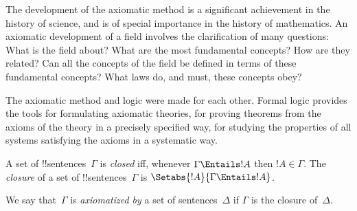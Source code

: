 



\begin{explain}
The development of the axiomatic method is a significant achievement
in the history of science, and is of special importance in the history
of mathematics.  An axiomatic development of a field involves the
clarification of many questions: What is the field about?  What are the
most fundamental concepts?  How are they related?  Can all the
concepts of the field be defined in terms of these fundamental
concepts?  What laws do, and must, these concepts obey?

The axiomatic method and logic were made for each other.  Formal logic
provides the tools for formulating axiomatic theories, for proving
theorems from the axioms of the theory in a precisely specified way,
for studying the properties of all systems satisfying the axioms in a
systematic way.
\end{explain}

\begin{defn}
A set of !!{sentence}s~$\Gamma$ is \emph{closed} iff, whenever
$\Gamma \Entails !A$ then $!A \in \Gamma$.  The \emph{closure} of a set
of !!{sentence}s~$\Gamma$ is $\Setabs{!A}{\Gamma \Entails !A}$.

We say that~$\Gamma$ is \emph{axiomatized by} a set of
sentences~$\Delta$ if $\Gamma$ is the closure of~$\Delta$.
\end{defn}

